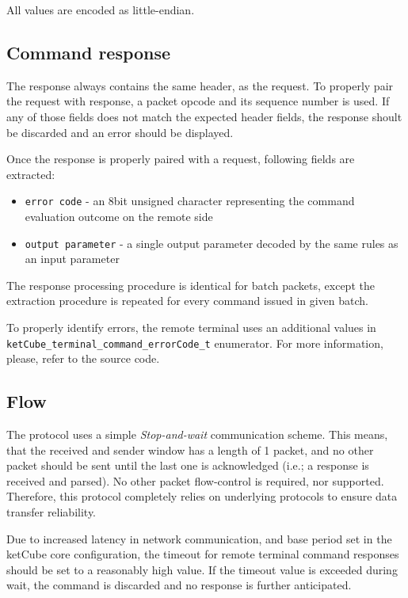 All values are encoded as little-endian.

\subsection{Command response}

The response always contains the same header, as the request. To properly pair the request with response, a packet opcode and its sequence number is used. If any of those fields does not match the expected header fields, the response shoult be discarded and an error should be displayed.

Once the response is properly paired with a request, following fields are extracted:

\begin{itemize}
	\item \texttt{error code} - an 8bit unsigned character representing the command evaluation outcome on the remote side
	\item \texttt{output parameter} - a single output parameter decoded by the same rules as an input parameter
\end{itemize}

The response processing procedure is identical for batch packets, except the extraction procedure is repeated for every command issued in given batch.

To properly identify errors, the remote terminal uses an additional values in \texttt{ketCube\_terminal\_command\_errorCode\_t} enumerator. For more information, please, refer to the source code.

\subsection{Flow}

The protocol uses a simple \textit{Stop-and-wait} communication scheme. This means, that the received and sender window has a length of 1 packet, and no other packet should be sent until the last one is acknowledged (i.e.; a response is received and parsed). No other packet flow-control is required, nor supported. Therefore, this protocol completely relies on underlying protocols to ensure data transfer reliability.

Due to increased latency in network communication, and base period set in the ketCube core configuration, the timeout for remote terminal command responses should be set to a reasonably high value. If the timeout value is exceeded during wait, the command is discarded and no response is further anticipated.

